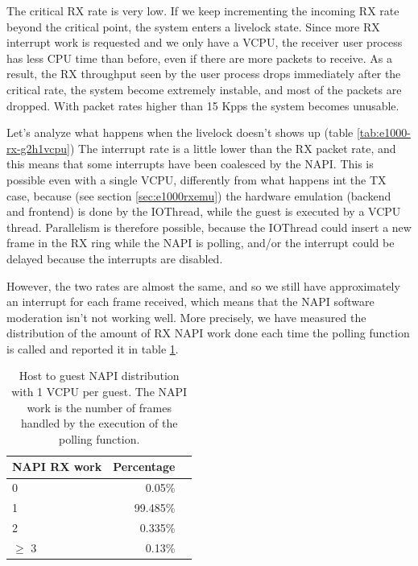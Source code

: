 The critical RX rate is very low. If we keep incrementing the incoming RX rate beyond the critical point, the system enters a livelock 
state. Since more RX interrupt work is requested and we only have a VCPU, the receiver user process has less CPU time than before, even
if there are more packets to receive. As a result, the RX throughput seen by the user process drops immediately after the critical rate,
the system become extremely instable, and most of the packets are dropped. With packet rates higher than 15 Kpps the system becomes
unusable.

\vspace{0.5cm}

Let's analyze what happens when the livelock doesn't shows up (table \ref{tab:e1000-rx-g2h1vcpu})
The interrupt rate is a little lower than the RX packet rate, and this means that some interrupts have been coalesced by the NAPI.
This is possible even with a single VCPU, differently from what happens int the TX case, because (see section \ref{sec:e1000rxemu})
the hardware emulation (backend and frontend) is done by the IOThread, while the guest is executed by a VCPU thread. Parallelism is 
therefore possible, because the IOThread could insert a new frame in the RX ring while the NAPI is polling, and/or the interrupt could
be delayed because the interrupts are disabled.

However, the two rates are almost the same, and so we still have approximately an interrupt for each frame received, which means that
the NAPI software moderation isn't not working well. More precisely, we have measured the distribution of the amount of RX NAPI work
done each time the polling function is called and reported it in table \ref{tab:e1000-rx-napi-dist}.

\begin{table}
\begin{center}
\begin{tabular}{lrl}
\toprule
\textbf{NAPI RX work} & \textbf{Percentage}\\
\midrule
0 & 0.05\%\\
1 & 99.485\%\\
2 & 0.335\%\\
$\geq$ 3 & 0.13\%\\
\bottomrule
\end{tabular}
\end{center}
\caption{Host to guest NAPI distribution with 1 VCPU per guest. The NAPI work is the number of
frames handled by the execution of the polling function.}
\label{tab:e1000-rx-napi-dist}
\end{table}

